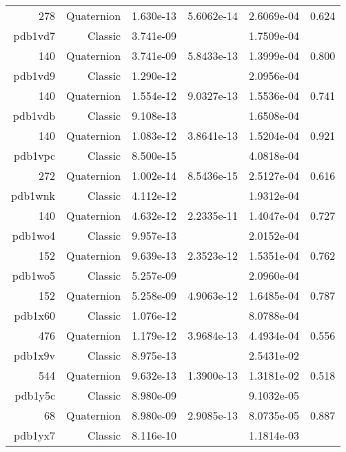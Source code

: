 \begin{xltabular}{\textwidth}{r|rS[table-format=1.3e+2]S[table-format=1.4e+2]S[table-format=1.4e+2]S[table-format=-1.3]}
278 & Quaternion & 1.630e-13 & 5.6062e-14 & 2.6069e-04 & 0.624\\  \addlinespace
{\color{red} pdb1vd7 } & Classic & 3.741e-09 &  & 1.7509e-04 & \\
140 & Quaternion & 3.741e-09 & 5.8433e-13 & 1.3999e-04 & 0.800\\  \addlinespace
{\color{red} pdb1vd9 } & Classic & 1.290e-12 &  & 2.0956e-04 & \\
140 & Quaternion & 1.554e-12 & 9.0327e-13 & 1.5536e-04 & 0.741\\  \addlinespace
{\color{red} pdb1vdb } & Classic & 9.108e-13 &  & 1.6508e-04 & \\
140 & Quaternion & 1.083e-12 & 3.8641e-13 & 1.5204e-04 & 0.921\\  \addlinespace
{\color{red} pdb1vpc } & Classic & 8.500e-15 &  & 4.0818e-04 & \\
272 & Quaternion & 1.002e-14 & 8.5436e-15 & 2.5127e-04 & 0.616\\  \addlinespace
{\color{red} pdb1wnk } & Classic & 4.112e-12 &  & 1.9312e-04 & \\
140 & Quaternion & 4.632e-12 & 2.2335e-11 & 1.4047e-04 & 0.727\\  \addlinespace
{\color{red} pdb1wo4 } & Classic & 9.957e-13 &  & 2.0152e-04 & \\
152 & Quaternion & 9.639e-13 & 2.3523e-12 & 1.5351e-04 & 0.762\\  \addlinespace
{\color{red} pdb1wo5 } & Classic & 5.257e-09 &  & 2.0960e-04 & \\
152 & Quaternion & 5.258e-09 & 4.9063e-12 & 1.6485e-04 & 0.787\\  \addlinespace
{\color{red} pdb1x60 } & Classic & 1.076e-12 &  & 8.0788e-04 & \\
476 & Quaternion & 1.179e-12 & 3.9684e-13 & 4.4934e-04 & 0.556\\  \addlinespace
{\color{red} pdb1x9v } & Classic & 8.975e-13 &  & 2.5431e-02 & \\
544 & Quaternion & 9.632e-13 & 1.3900e-13 & 1.3181e-02 & 0.518\\  \addlinespace
{\color{red} pdb1y5c } & Classic & 8.980e-09 &  & 9.1032e-05 & \\
68 & Quaternion & 8.980e-09 & 2.9085e-13 & 8.0735e-05 & 0.887\\  \addlinespace
{\color{red} pdb1yx7 } & Classic & 8.116e-10 &  & 1.1814e-03 & \\

\end{xltabular}
